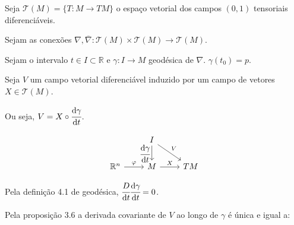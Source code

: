 \documentclass[10pt,a4paper]{article}
\begin{document}
		\begin{center}
		\end{center}

		Seja $\mathcal{T}(M) = \{ T: M \rightarrow TM \}$ o espa\c{c}o vetorial dos campos $(0,1)$ tensoriais diferenci\'aveis.

		Sejam as conex\~oes $\nabla, \overline{\nabla}: \mathcal{T}(M) \times \mathcal{T}(M) \rightarrow \mathcal{T}(M)$.

		Sejam o intervalo $t \in I \subset \mathbb{R}$ e $\gamma : I \rightarrow M$ geod\'esica de $\nabla$. $\gamma(t_0) = p$.

		Seja $V$ um campo vetorial diferenci\'avel induzido por um campo de vetores $X \in \mathcal{T}(M)$.

		Ou seja, $V = X \circ \cfrac{\mathrm{d} \gamma}{\mathrm{d} t}$.

		\[
		\begin{tikzcd}
		& I \arrow[swap]{d}{\cfrac{\mathrm{d} \gamma}{\mathrm{d} t}} \arrow{rd}{V} &  \\
		\mathbb{R}^n \arrow{r}{\varphi} & M \arrow{r}{X} & TM
		\end{tikzcd}
		\]

		Pela defini\c{c}\~ao 4.1 de geod\'esica, $\cfrac{D}{\mathrm{d} t} \cfrac{\mathrm{d} \gamma}{\mathrm{d} t} = 0$.

		Pela proposi\c{c}\~ao 3.6 a derivada covariante de $V$ ao longo de $\gamma$  \'e \'unica e igual a:
\end{document}
